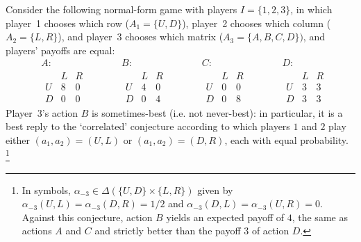 \begin{example}
	\label{example:rbty_indep}
	Consider the following normal-form game with players $I = \{1,2,3\}$, in which player~1 chooses which row ($A_1 = \{U,D\}$), player~2 chooses which column ($A_2 = \{L,R\}$), and player~3 chooses which matrix ($A_3 = \{A,B,C,D\})$, and players' payoffs are equal:
	\begin{equation*}
		\begin{aligned}
			&A:\\
			&\begin{array}{c|cc}
				  & L & R \\ \hline
				U & 8 & 0 \\
				D & 0 & 0
			\end{array}
		\end{aligned}
		\qquad
		\begin{aligned}
			&B:\\
			&\begin{array}{c|cc}
				  & L & R \\ \hline
				U & 4 & 0 \\
				D & 0 & 4
			\end{array}
		\end{aligned}
		\qquad
		\begin{aligned}
			&C:\\
			&\begin{array}{c|cc}
				  & L & R \\ \hline
				U & 0 & 0 \\
				D & 0 & 8
			\end{array}
		\end{aligned}
		\qquad
		\begin{aligned}
			&D:\\
			&\begin{array}{c|cc}
				  & L & R \\ \hline
				U & 3 & 3 \\
				D & 3 & 3
			\end{array}
		\end{aligned}
	\end{equation*}
	Player~3's action $B$ is sometimes-best (i.e. not never-best): in particular, it is a best reply to the `correlated' conjecture according to which players $1$ and $2$ play either $(a_1,a_2) = (U,L)$ or $(a_1,a_2) = (D,R)$, each with equal probability.%
		\footnote{In symbols, $\alpha_{-3} \in \Delta(\{U,D\} \times \{L,R\})$ given by $\alpha_{-3}(U,L) = \alpha_{-3}(D,R) = 1/2$ and $\alpha_{-3}(D,L) = \alpha_{-3}(U,R) = 0$. Against this conjecture, action $B$ yields an expected payoff of $4$, the same as actions $A$ and $C$ and strictly better than the payoff $3$ of action $D$.}

\end{example}
